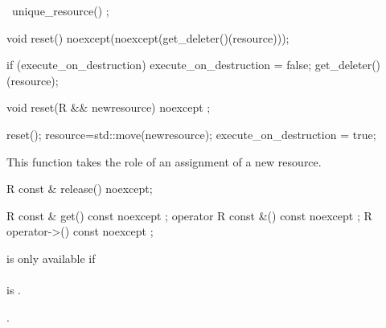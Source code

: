\documentclass[ebook,11pt,article]{memoir}
\begin{document}
\begin{itemdecl}
~unique_resource() ;
\end{itemdecl}

\pnum
\effects {}

\begin{itemdecl}
void reset() noexcept(noexcept(get_deleter()(resource)));
\end{itemdecl}

\pnum
\effects 
\begin{codeblock}
if (execute_on_destruction)  {
    execute_on_destruction = false;
	get_deleter()(resource);
}
\end{codeblock}

\begin{itemdecl}
void reset(R && newresource) noexcept ;
\end{itemdecl}

\pnum
\effects 
\begin{codeblock}
reset(); 
resource=std::move(newresource);
execute_on_destruction = true;
\end{codeblock}

\pnum
\enternote This function takes the role of an assignment of a new resource.
\exitnote

\begin{itemdecl}
R const & release() noexcept;
\end{itemdecl}

\pnum
\effects {}

\pnum
\returns {}


\begin{itemdecl}
R const & get() const noexcept ;
operator  R const &() const noexcept ;
R operator->() const noexcept ;
\end{itemdecl}

\pnum
\requires {} is only available if \\
\\ is . 

\pnum
\returns {}.

%
%
\end{document}
